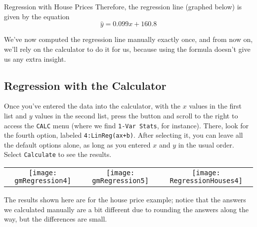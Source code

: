 \begin{example}{Regression with House Prices}
Therefore, the regression line (graphed below) is given by the equation
\[\boxed{\hat{y} = 0.099 x + 160.8}\]

\begin{center}
\end{center}
\end{example}

We've now computed the regression line manually exactly once, and from now on, we'll rely on the calculator to do it for us, because using the formula doesn't give us any extra insight.

\subsection{Regression with the Calculator}
Once you've entered the data into the calculator, with the $x$ values in the first list and $y$ values in the second list, press the  button and scroll to the right to access the \texttt{CALC} menu (where we find \texttt{1-Var Stats}, for instance).  There, look for the fourth option, labeled \texttt{4:LinReg(ax+b)}.  After selecting it, you can leave all the default options alone, as long as you entered $x$ and $y$ in the usual order.  Select \texttt{Calculate} to see the results.
\begin{center}
\begin{tabular}{c c c}
\texttt{[image: gmRegression4]}
& \texttt{[image: gmRegression5]}
& \texttt{[image: RegressionHouses4]}
\end{tabular}
\end{center}
The results shown here are for the house price example; notice that the answers we calculated manually are a bit different due to rounding the answers along the way, but the differences are small.

